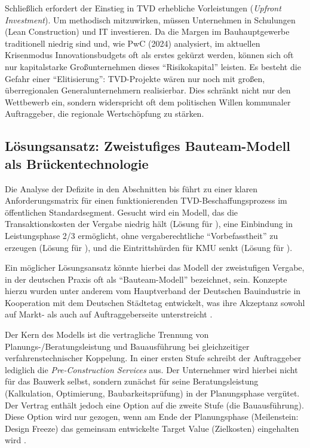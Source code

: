 Schließlich erfordert der Einstieg in \acs{TVD} erhebliche Vorleistungen (\textit{Upfront Investment}). Um methodisch mitzuwirken, müssen Unternehmen in Schulungen (Lean Construction) und IT investieren. Da die Margen im Bauhauptgewerbe traditionell niedrig sind und, wie PwC (2024) analysiert, im aktuellen Krisenmodus Innovationsbudgets oft als erstes gekürzt werden, können sich oft nur kapitalstarke Großunternehmen dieses \enquote{Risikokapital} leisten. \autocite [Vgl.][S.~3 ff]{berbner_bauindustrie_2024}
Es besteht die Gefahr einer \enquote{Elitisierung}: \acs{TVD}-Projekte wären nur noch mit großen, überregionalen Generalunternehmern realisierbar. Dies schränkt nicht nur den Wettbewerb ein, sondern widerspricht oft dem politischen Willen kommunaler Auftraggeber, die regionale Wertschöpfung zu stärken.

\subsection{Lösungsansatz: Zweistufiges Bauteam-Modell als Brückentechnologie}
\label{sec:5.1.4}

Die Analyse der Defizite in den Abschnitten  bis  führt zu einer klaren Anforderungsmatrix für einen funktionierenden \acs{TVD}-Beschaffungsprozess im öffentlichen Standardsegment. Gesucht wird ein Modell, das die Transaktionskosten der Vergabe niedrig hält (Lösung für ), eine Einbindung in Leistungsphase 2/3 ermöglicht, ohne vergaberechtliche \enquote{Vorbefasstheit} zu erzeugen (Lösung für ), und die Eintrittshürden für \acs{KMU} senkt (Lösung für ).

Ein möglicher Lösungsansatz könnte hierbei das Modell der zweistufigen Vergabe, in der deutschen Praxis oft als \enquote{Bauteam-Modell} bezeichnet, sein. Konzepte hierzu wurden unter anderem vom Hauptverband der Deutschen Bauindustrie in Kooperation mit dem Deutschen Städtetag entwickelt, was ihre Akzeptanz sowohl auf Markt- als auch auf Auftraggeberseite unterstreicht \autocite[Vgl.][S.~3]{hauptverband_der_deutschen_bauindustrie_ev_partnerschaftliche_2020}.

Der Kern des Modells ist die vertragliche Trennung von Planungs-/Beratungsleistung und Bauausführung bei gleichzeitiger verfahrenstechnischer Koppelung.
In einer ersten Stufe schreibt der Auftraggeber lediglich die \textit{Pre-Construction Services} aus. Der Unternehmer wird hierbei nicht für das Bauwerk selbst, sondern zunächst für seine Beratungsleistung (Kalkulation, Optimierung, Baubarkeitsprüfung) in der Planungsphase vergütet.
Der Vertrag enthält jedoch eine Option auf die zweite Stufe (die Bauausführung). Diese Option wird nur gezogen, wenn am Ende der Planungsphase (Meilenstein: Design Freeze) das gemeinsam entwickelte Target Value (Zielkosten) eingehalten wird \autocite[Vgl.][S.~4 f]{hauptverband_der_deutschen_bauindustrie_ev_partnerschaftliche_2020}.

